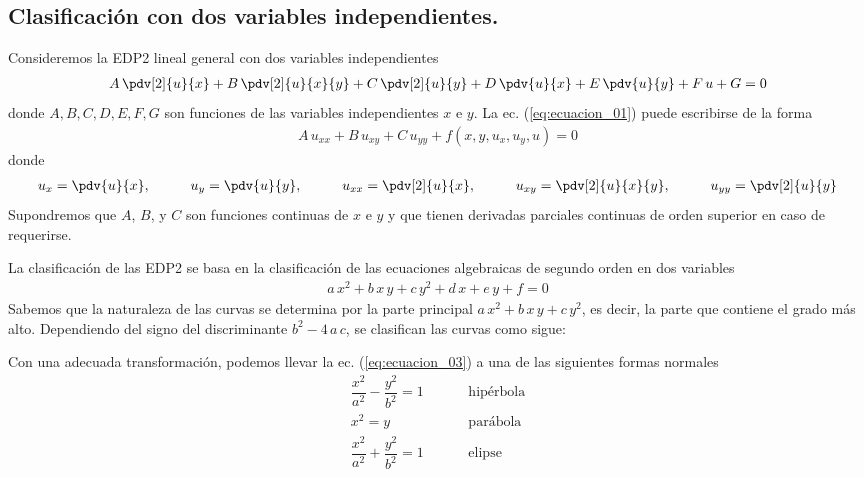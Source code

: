 \subsection{Clasificación con dos variables independientes.}
Consideremos la EDP2 lineal general con dos variables independientes
\begin{align}
A \, \pdv[2]{u}{x} + B \, \pdv[2]{u}{x}{y} + C \, \pdv[2]{u}{y} + D \, \pdv{u}{x} + E \, \pdv{u}{y} + F \, u + G = 0
\label{eq:ecuacion_01}
\end{align}
donde $A, B, C, D, E, F, G$ son funciones de las variables independientes $x$ e $y$. La ec. (\ref{eq:ecuacion_01}) puede escribirse de la forma
\begin{align}
A \, u_{xx} + B \, u_{xy} + C \, u_{yy} + f(x, y, u_{x}, u_{y}, u) = 0
\label{eq:ecuacion_02}
\end{align}
donde
\begin{align*}
u_{x} = \pdv{u}{x}, \hspace{1cm} u_{y} = \pdv{u}{y}, \hspace{1cm} u_{xx} = \pdv[2]{u}{x}, \hspace{1cm} u_{xy} = \pdv[2]{u}{x}{y}, \hspace{1cm} u_{yy} = \pdv[2]{u}{y}
\end{align*}
Supondremos que $A$, $B$, y $C$ son funciones continuas de $x$ e $y$ y que tienen derivadas parciales continuas de orden superior en caso de requerirse.
\par
La clasificación de las EDP2 se basa en la clasificación de las ecuaciones algebraicas de segundo orden en dos variables
\begin{align}
a \, x^{2} + b \, x \, y + c \, y^{2} + d \, x + e \, y + f = 0
\label{eq:ecuacion_03}
\end{align}
Sabemos que la naturaleza de las curvas se determina por la parte principal $a \, x^{2} + b \, x \, y + c \, y^{2}$, es decir, la parte que contiene el grado más alto. Dependiendo del signo del discriminante $b^{2} - 4 \, a \, c$, se clasifican las curvas como sigue:
\par
\begin{center}
\end{center}
Con una adecuada transformación, podemos llevar la ec. (\ref{eq:ecuacion_03}) a una de las siguientes formas normales
\begin{align*}
\dfrac{x^{2}}{a^{2}} - \dfrac{y^{2}}{b^{2}} =  1 \hspace{1cm} &\text{hipérbola} \\[1em]
x^{2} = y \hspace{1cm} &\text{parábola} \\[1em]
\dfrac{x^{2}}{a^{2}} + \dfrac{y^{2}}{b^{2}} =  1 \hspace{1cm} &\text{elipse}
\end{align*}
